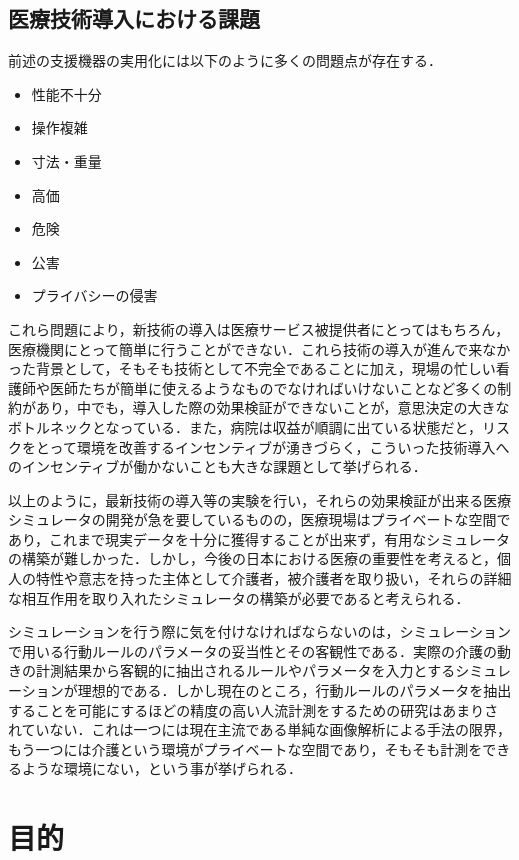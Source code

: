 \subsection{医療技術導入における課題}

前述の支援機器の実用化には以下のように多くの問題点が存在する．

\begin{itemize}
 \item 性能不十分
 \item 操作複雑
 \item 寸法・重量
 \item 高価
 \item 危険
 \item 公害
 \item プライバシーの侵害
\end{itemize}

これら問題により，新技術の導入は医療サービス被提供者にとってはもちろん，医療機関にとって簡単に行うことができない．これら技術の導入が進んで来なかった背景として，そもそも技術として不完全であることに加え，現場の忙しい看護師や医師たちが簡単に使えるようなものでなければいけないことなど多くの制約があり，中でも，導入した際の効果検証ができないことが，意思決定の大きなボトルネックとなっている．また，病院は収益が順調に出ている状態だと，リスクをとって環境を改善するインセンティブが湧きづらく，こういった技術導入へのインセンティブが働かないことも大きな課題として挙げられる．

以上のように，最新技術の導入等の実験を行い，それらの効果検証が出来る医療シミュレータの開発が急を要しているものの，医療現場はプライベートな空間であり，これまで現実データを十分に獲得することが出来ず，有用なシミュレータの構築が難しかった．しかし，今後の日本における医療の重要性を考えると，個人の特性や意志を持った主体として介護者，被介護者を取り扱い，それらの詳細な相互作用を取り入れたシミュレータの構築が必要であると考えられる．

シミュレーションを行う際に気を付けなければならないのは，シミュレーションで用いる行動ルールのパラメータの妥当性とその客観性である．実際の介護の動きの計測結果から客観的に抽出されるルールやパラメータを入力とするシミュレーションが理想的である．しかし現在のところ，行動ルールのパラメータを抽出することを可能にするほどの精度の高い人流計測をするための研究はあまりされていない．これは一つには現在主流である単純な画像解析による手法の限界，もう一つには介護という環境がプライベートな空間であり，そもそも計測をできるような環境にない，という事が挙げられる．

\section{目的}

